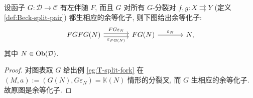 \begin{lemma}\label{prop:Beck-FG-coeq}
	设函子 $G: \mathcal{D} \to \mathcal{C}$ 有左伴随 $F$, 而且 $G$ 对所有 $G$-分裂对 $f, g: X \rightrightarrows Y$ (定义 \ref{def:Beck-split-pair}) 都生相应的余等化子, 则下图给出余等化子:
	\begin{equation*}\begin{tikzcd}[column sep=large]
		FGFG(N) \arrow[shift left, r, "FG\varepsilon_N"] \arrow[shift right, r, "\varepsilon_{FG(N)}"'] & FG(N) \arrow[r, "\varepsilon_N"] & N,
	\end{tikzcd}\end{equation*}
	其中 $N \in \operatorname{Ob}(\mathcal{D})$.
\end{lemma}
\begin{proof}
	对图表取 $G$ 给出例 \ref{eg:T-split-fork} 在 $(M, a) := (G(N), G\varepsilon_N) = \mathbb{K}(N)$ 情形的分裂叉, 而 $G$ 生相应的余等化子. 故原图是余等化子.
\end{proof}

